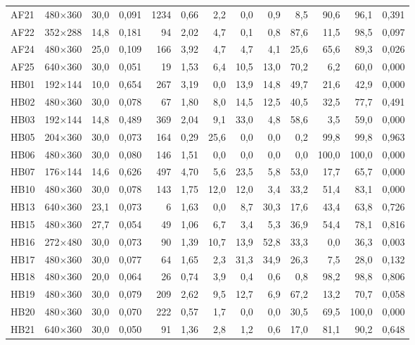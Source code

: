 \begin{table}[htbp]
\begin{tabular}{lllrrrrrrrrrr}
AF21 & 480$\times$360 & 30,0 & 0,091 & 1234 & 0,66 & 2,2 & 0,0 & 0,9 & 8,5 & 90,6 & 96,1 & 0,391 \\
AF22 & 352$\times$288 & 14,8 & 0,181 & 94 & 2,02 & 4,7 & 0,1 & 0,8 & 87,6 & 11,5 & 98,5 & 0,097 \\
AF24 & 480$\times$360 & 25,0 & 0,109 & 166 & 3,92 & 4,7 & 4,7 & 4,1 & 25,6 & 65,6 & 89,3 & 0,026 \\
AF25 & 640$\times$360 & 30,0 & 0,051 & 19 & 1,53 & 6,4 & 10,5 & 13,0 & 70,2 & 6,2 & 60,0 & 0,000 \\
HB01 & 192$\times$144 & 10,0 & 0,654 & 267 & 3,19 & 0,0 & 13,9 & 14,8 & 49,7 & 21,6 & 42,9 & 0,000 \\
HB02 & 480$\times$360 & 30,0 & 0,078 & 67 & 1,80 & 8,0 & 14,5 & 12,5 & 40,5 & 32,5 & 77,7 & 0,491 \\
HB03 & 192$\times$144 & 14,8 & 0,489 & 369 & 2,04 & 9,1 & 33,0 & 4,8 & 58,6 & 3,5 & 59,0 & 0,000 \\
HB05 & 204$\times$360 & 30,0 & 0,073 & 164 & 0,29 & 25,6 & 0,0 & 0,0 & 0,2 & 99,8 & 99,8 & 0,963 \\
HB06 & 480$\times$360 & 30,0 & 0,080 & 146 & 1,51 & 0,0 & 0,0 & 0,0 & 0,0 & 100,0 & 100,0 & 0,000 \\
HB07 & 176$\times$144 & 14,6 & 0,626 & 497 & 4,70 & 5,6 & 23,5 & 5,8 & 53,0 & 17,7 & 65,7 & 0,000 \\
HB10 & 480$\times$360 & 30,0 & 0,078 & 143 & 1,75 & 12,0 & 12,0 & 3,4 & 33,2 & 51,4 & 83,1 & 0,000 \\
HB13 & 640$\times$360 & 23,1 & 0,073 & 6 & 1,63 & 0,0 & 8,7 & 30,3 & 17,6 & 43,4 & 63,8 & 0,726 \\
HB15 & 480$\times$360 & 27,7 & 0,054 & 49 & 1,06 & 6,7 & 3,4 & 5,3 & 36,9 & 54,4 & 78,1 & 0,816 \\
HB16 & 272$\times$480 & 30,0 & 0,073 & 90 & 1,39 & 10,7 & 13,9 & 52,8 & 33,3 & 0,0 & 36,3 & 0,003 \\
HB17 & 480$\times$360 & 30,0 & 0,077 & 64 & 1,65 & 2,3 & 31,3 & 34,9 & 26,3 & 7,5 & 28,0 & 0,132 \\
HB18 & 480$\times$360 & 20,0 & 0,064 & 26 & 0,74 & 3,9 & 0,4 & 0,6 & 0,8 & 98,2 & 98,8 & 0,806 \\
HB19 & 480$\times$360 & 30,0 & 0,079 & 209 & 2,62 & 9,5 & 12,7 & 6,9 & 67,2 & 13,2 & 70,7 & 0,058 \\
HB20 & 480$\times$360 & 30,0 & 0,070 & 222 & 0,57 & 1,7 & 0,0 & 0,0 & 30,5 & 69,5 & 100,0 & 0,000 \\
HB21 & 640$\times$360 & 30,0 & 0,050 & 91 & 1,36 & 2,8 & 1,2 & 0,6 & 17,0 & 81,1 & 90,2 & 0,648 \\

\end{tabular}
\end{table}
